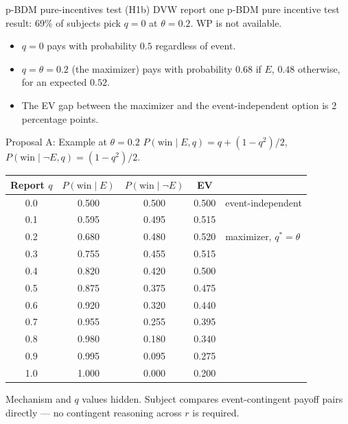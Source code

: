 \documentclass[11pt,aspectratio=169]{beamer}
\begin{document}
\begin{frame}{p-BDM pure-incentives test (H1b)}
DVW report one p-BDM pure incentive test result: 69\% of subjects pick $q = 0$ at $\theta = 0.2$. WP is not available.

\vspace{0.7em}
\begin{itemize}
\item $q = 0$ pays with probability $0.5$ regardless of event.
\item $q = \theta = 0.2$ (the maximizer) pays with probability $0.68$ if $E$, $0.48$ otherwise, for an expected $0.52$.
\item The EV gap between the maximizer and the event-independent option is 2 percentage points.
\end{itemize}


\end{frame}

\begin{frame}{Proposal A: Example at $\theta = 0.2$}
\small
$P(\text{win} \mid E, q) = q + (1 - q^2)/2$, \quad $P(\text{win} \mid \lnot E, q) = (1 - q^2)/2$.

\vspace{0.5em}
\footnotesize
\begin{tabular}{@{}c c c c l@{}}
\toprule
Report $q$ & $P(\text{win} \mid E)$ & $P(\text{win} \mid \lnot E)$ & EV & \\
\midrule
0.0 & 0.500 & 0.500 & 0.500 & event-independent \\
0.1 & 0.595 & 0.495 & 0.515 & \\
0.2 & 0.680 & 0.480 & 0.520 & maximizer, $q^* = \theta$ \\
0.3 & 0.755 & 0.455 & 0.515 & \\
0.4 & 0.820 & 0.420 & 0.500 & \\
0.5 & 0.875 & 0.375 & 0.475 & \\
0.6 & 0.920 & 0.320 & 0.440 & \\
0.7 & 0.955 & 0.255 & 0.395 & \\
0.8 & 0.980 & 0.180 & 0.340 & \\
0.9 & 0.995 & 0.095 & 0.275 & \\
1.0 & 1.000 & 0.000 & 0.200 & \\
\bottomrule
\end{tabular}

\vspace{0.3em}
\footnotesize
Mechanism and $q$ values hidden. Subject compares event-contingent payoff pairs directly --- no contingent reasoning across $r$ is required.
\end{frame}
\end{document}
